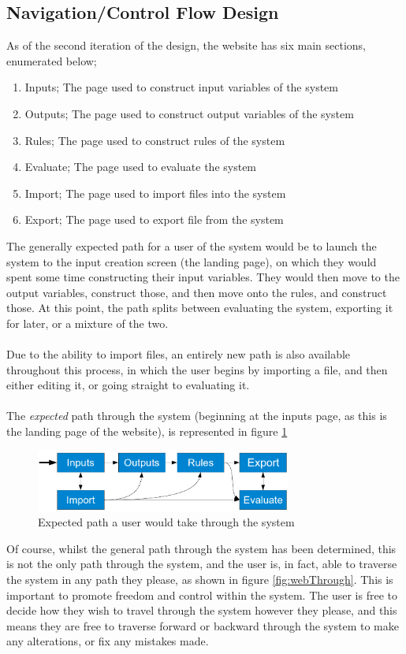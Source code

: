 \subsection{Navigation/Control Flow Design}	
\label{subsec:nav}	
As of the second iteration of the design, the website has six main sections, enumerated below;
\begin{enumerate}
\item Inputs;
The page used to construct input variables of the system
\item Outputs;
The page used to construct output variables of the system
\item Rules;
The page used to construct rules of the system
\item Evaluate;
The page used to evaluate the system
\item Import;
The page used to import files into the system
\item Export;
The page used to export file from the system
\end{enumerate}
\noindent 
The generally expected path for a user of the system would be to launch the system to the input creation screen (the landing page), on which they would spent some time constructing their input variables. They would then move to the output variables, construct those, and then move onto the rules, and construct those. At this point, the path splits between evaluating the system, exporting it for later, or a mixture of the two. \ \\
\ \\
Due to the ability to import files, an entirely new path is also available throughout this process, in which the user begins by importing a file, and then either editing it, or going straight to evaluating it.\ \\
\ \\
The \emph{expected} path through the system (beginning at the inputs page, as this is the landing page of the website), is represented in figure \ref{fig:pathThrough}

\begin{figure}[ht!]
\begin{center}
\includegraphics[width=0.75\textwidth]{images/genericPathOne}
\end{center}
\caption{Expected path a user would take through the system}
\label{fig:pathThrough}
\end{figure}
\noindent 
Of course, whilst the general path through the system has been determined, this is not the only path through the system, and the user is, in fact, able to traverse the system in any path they please, as shown in figure \ref{fig:webThrough}. This is important to promote freedom and control within the system. The user is free to decide how they wish to travel through the system however they please, and this means they are free to traverse forward or backward through the system to make any alterations, or fix any mistakes made.

